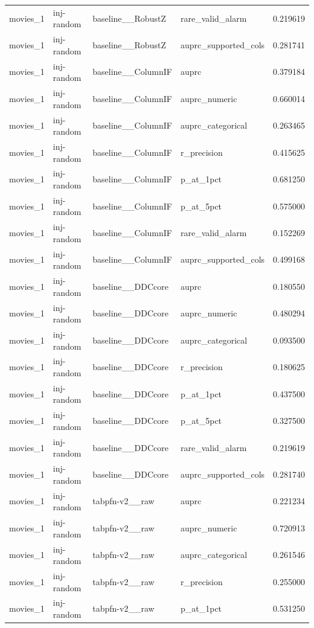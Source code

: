 \begin{tabular}{lllll}
movies\_1 & inj-random & baseline\_\_RobustZ & rare\_valid\_alarm & 0.219619 \\
movies\_1 & inj-random & baseline\_\_RobustZ & auprc\_supported\_cols & 0.281741 \\
movies\_1 & inj-random & baseline\_\_ColumnIF & auprc & 0.379184 \\
movies\_1 & inj-random & baseline\_\_ColumnIF & auprc\_numeric & 0.660014 \\
movies\_1 & inj-random & baseline\_\_ColumnIF & auprc\_categorical & 0.263465 \\
movies\_1 & inj-random & baseline\_\_ColumnIF & r\_precision & 0.415625 \\
movies\_1 & inj-random & baseline\_\_ColumnIF & p\_at\_1pct & 0.681250 \\
movies\_1 & inj-random & baseline\_\_ColumnIF & p\_at\_5pct & 0.575000 \\
movies\_1 & inj-random & baseline\_\_ColumnIF & rare\_valid\_alarm & 0.152269 \\
movies\_1 & inj-random & baseline\_\_ColumnIF & auprc\_supported\_cols & 0.499168 \\
movies\_1 & inj-random & baseline\_\_DDCcore & auprc & 0.180550 \\
movies\_1 & inj-random & baseline\_\_DDCcore & auprc\_numeric & 0.480294 \\
movies\_1 & inj-random & baseline\_\_DDCcore & auprc\_categorical & 0.093500 \\
movies\_1 & inj-random & baseline\_\_DDCcore & r\_precision & 0.180625 \\
movies\_1 & inj-random & baseline\_\_DDCcore & p\_at\_1pct & 0.437500 \\
movies\_1 & inj-random & baseline\_\_DDCcore & p\_at\_5pct & 0.327500 \\
movies\_1 & inj-random & baseline\_\_DDCcore & rare\_valid\_alarm & 0.219619 \\
movies\_1 & inj-random & baseline\_\_DDCcore & auprc\_supported\_cols & 0.281740 \\
movies\_1 & inj-random & tabpfn-v2\_\_raw & auprc & 0.221234 \\
movies\_1 & inj-random & tabpfn-v2\_\_raw & auprc\_numeric & 0.720913 \\
movies\_1 & inj-random & tabpfn-v2\_\_raw & auprc\_categorical & 0.261546 \\
movies\_1 & inj-random & tabpfn-v2\_\_raw & r\_precision & 0.255000 \\
movies\_1 & inj-random & tabpfn-v2\_\_raw & p\_at\_1pct & 0.531250 \\

\end{tabular}
